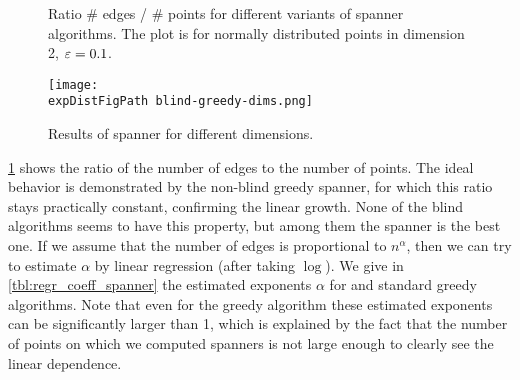 

\begin{figure}[!htbp]
            \caption{Ratio \# edges / \# points for different variants of spanner 
            algorithms. The plot is for normally distributed points
            in dimension 2, $\varepsilon = 0.1$.}
            \label{fig:spanner_ratio}
\end{figure}

\begin{figure}[ht!]
    \begin{centering}
    \texttt{[image: \\expDistFigPath blind-greedy-dims.png]}
    \caption{Results of \bgrdy spanner for different dimensions.}
    \label{fig:blind_greedy_dimensions}
    \end{centering}
\end{figure}


\cref{fig:spanner_ratio} shows the ratio of the number of edges to the number of points.
The ideal behavior is demonstrated by the non-blind greedy spanner,
for which this ratio stays practically constant, confirming the linear growth.
None of the blind algorithms seems to have this property, but among them
the \bgrdy spanner is the best one. If we assume that the number of edges
is proportional to $n^\alpha$, then we can try to estimate $\alpha$ by 
linear regression (after taking $\log$).  We give in \cref{tbl:regr_coeff_spanner}
the estimated exponents $\alpha$ for \bgrdy and standard
greedy algorithms. Note that even for the greedy algorithm these estimated
exponents can be significantly larger than 1,
which is explained by the fact that the number of points
on which we computed spanners is not large enough to clearly see
the linear dependence.


